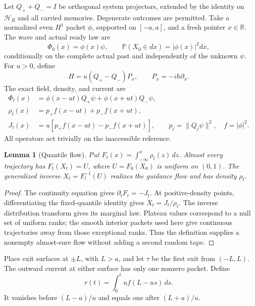 \documentclass[11pt,oneside,openany]{book}
\newtheorem{lemma}[theorem]{Lemma}
\theoremstyle{definition}
\theoremstyle{remark}\newtheorem{remark}[theorem]{Remark}
\begin{document}
Let $Q_++Q_-=I$ be orthogonal system projectors, extended by the identity
on $\mathcal H_R$ and all carried memories. Degenerate outcomes are permitted.
Take a normalized even $H^1$ packet $\phi$, supported on $[-a,a]$, and a fresh
pointer $x\in\mathbb R$. The wave and actual ready law are
\[
 \Phi_0(x)=\phi(x)\psi,\qquad
 \mathbb P(X_0\in dx)=|\phi(x)|^2dx,
\]
conditionally on the complete actual past and independently of the unknown
$\psi$. For $u>0$, define
\begin{equation}
 H=u(Q_+-Q_-)P_x,\qquad P_x=-i\hbar\partial_x.
 \label{cfg:translationH}
\end{equation}
The exact field, density, and current are
\begin{align}
 \Phi_t(x)&=\phi(x-ut)Q_+\psi+\phi(x+ut)Q_-\psi,\\
 \rho_t(x)&=p_+ f(x-ut)+p_- f(x+ut),\\
 J_t(x)&=u[p_+f(x-ut)-p_-f(x+ut)],
 \qquad p_j=\|Q_j\psi\|^2,\quad f=|\phi|^2.
 \label{cfg:split}
\end{align}
All operators act trivially on the inaccessible reference.

\begin{lemma}[Quantile flow]\label{cfg:quantile}
Put $F_t(x)=\int_{-\infty}^x\rho_t(z)\,dz$. Almost every trajectory
has $F_t(X_t)=U$, where $U=F_0(X_0)$ is uniform on $(0,1)$.
The generalized inverse $X_t=F_t^{-1}(U)$ realizes the guidance flow
and has density $\rho_t$.
\end{lemma}
\begin{proof}
The continuity equation gives $\partial_tF_t=-J_t$.
At positive-density points, differentiating the fixed-quantile identity gives
$\dot X_t=J_t/\rho_t$. The inverse distribution transform gives its marginal
law. Plateau values correspond to a null set of uniform ranks; the smooth
interior packets used here give continuous trajectories away from those
exceptional ranks. Thus the definition supplies a nonempty almost-sure
flow without adding a second random tape.
\end{proof}

Place exit surfaces at $\pm L$, with $L>a$, and let $\tau$ be the first
exit from $(-L,L)$. The outward current at either surface has only one
nonzero packet. Define
\[
 r(t)=\int_0^t u f(L-us)\,ds.
\]
It vanishes before $(L-a)/u$ and equals one after $(L+a)/u$.
\end{document}
